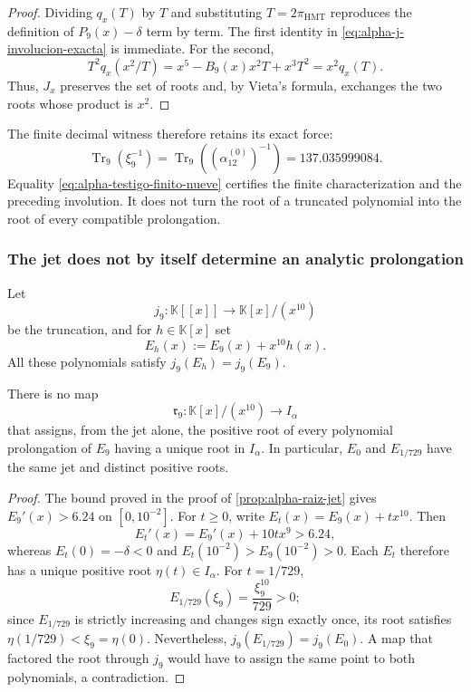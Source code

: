 \begin{proof}
Dividing \(q_x(T)\) by \(T\) and substituting
\(T=2\pi_{\mathrm{HMT}}\) reproduces the definition of \(P_9(x)-\delta\)
term by term. The first identity in
\eqref{eq:alpha-j-involucion-exacta} is immediate. For the second,
\[
 T^2q_x(x^2/T)
 =x^5-B_9(x)x^2T+x^3T^2=x^2q_x(T).
\]
Thus, \(J_x\) preserves the set of roots and, by Vieta's formula, exchanges
the two roots whose product is \(x^2\).
\end{proof}

The finite decimal witness therefore retains its exact force:
\begin{equation}
 \operatorname{Tr}_9(\xi_9^{-1})
 =\operatorname{Tr}_9\!\left((\alpha_{12}^{(0)})^{-1}\right)
 =137.035999084.
 \label{eq:alpha-testigo-finito-nueve}
\end{equation}
Equality \eqref{eq:alpha-testigo-finito-nueve} certifies the finite
characterization and the preceding involution. It does not turn the root of a
truncated polynomial into the root of every compatible prolongation.

\subsubsection{The jet does not by itself determine an analytic prolongation}

Let
\[
 j_9:\mathbb K[[x]]\longrightarrow \mathbb K[x]/(x^{10})
\]
be the truncation, and for \(h\in\mathbb K[x]\) set
\begin{equation}
 E_h(x):=E_9(x)+x^{10}h(x).
 \label{eq:alpha-familia-prolongaciones-mismo-jet}
\end{equation}
All these polynomials satisfy \(j_9(E_h)=j_9(E_9)\).

\begin{theorem}
\label{thm:alpha-no-unicidad-prolongacion-jet}
There is no map
\[
 \mathfrak r_9:\mathbb K[x]/(x^{10})\longrightarrow I_\alpha
\]
that assigns, from the jet alone, the positive root of every polynomial
prolongation of \(E_9\) having a unique root in \(I_\alpha\). In particular,
\(E_0\) and \(E_{1/729}\) have the same jet and distinct positive roots.
\end{theorem}

\begin{proof}
The bound proved in the proof of \ref{prop:alpha-raiz-jet} gives
\(E_9'(x)>6.24\) on \([0,10^{-2}]\). For \(t\geq0\), write
\(E_t(x)=E_9(x)+tx^{10}\). Then
\[
 E_t'(x)=E_9'(x)+10tx^9>6.24,
\]
whereas \(E_t(0)=-\delta<0\) and
\(E_t(10^{-2})>E_9(10^{-2})>0\). Each \(E_t\) therefore has a unique
positive root \(\eta(t)\in I_\alpha\). For \(t=1/729\),
\[
 E_{1/729}(\xi_9)=\frac{\xi_9^{10}}{729}>0;
\]
since \(E_{1/729}\) is strictly increasing and changes sign exactly once,
its root satisfies \(\eta(1/729)<\xi_9=\eta(0)\). Nevertheless,
\(j_9(E_{1/729})=j_9(E_0)\). A map that factored the root through \(j_9\)
would have to assign the same point to both polynomials, a contradiction.
\end{proof}

